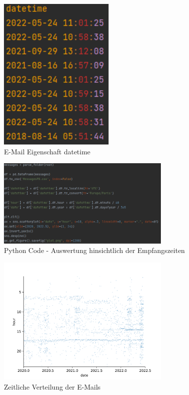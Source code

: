 \begin{figure}
    \centering
    \includegraphics[width=0.50\textwidth]{images/datetime.PNG}
    \caption{E-Mail Eigenschaft datetime} 
    \label{fig:datetime}
\end{figure}

\begin{figure}
    \centering
    \includegraphics[width=0.75\textwidth]{images/Auswertung_Zeiten.PNG}
    \caption{Python Code - Auswertung hinsichtlich der Empfangszeiten} 
    \label{fig:emailsdatetime}
\end{figure}

\begin{figure}
    \centering
    \includegraphics[width=0.75\textwidth]{images/plot.PNG}
    \caption{Zeitliche Verteilung der E-Mails} 
    \label{fig:auswertungzeitlich}
\end{figure}


